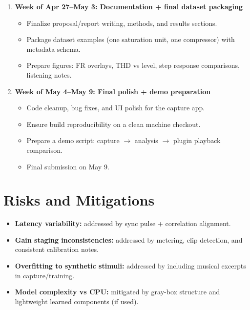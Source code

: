 \documentclass[11pt, letterpaper]{article}
\begin{document}
\begin{enumerate}[leftmargin=1.5em]
\begin{itemize}[leftmargin=1.5em]
              \item Iterate: adjust filter parameters, waveshaper mapping, optional GR-dependent color block.
              \item Profile CPU and confirm stable real-time operation at up to 96\,kHz.
          \end{itemize}
    \item \textbf{Week of Apr 27--May 3: Documentation + final dataset packaging}
          \begin{itemize}[leftmargin=1.5em]
              \item Finalize proposal/report writing, methods, and results sections.
              \item Package dataset examples (one saturation unit, one compressor) with metadata schema.
              \item Prepare figures: FR overlays, THD vs level, step response comparisons, listening notes.
          \end{itemize}
    \item \textbf{Week of May 4--May 9: Final polish + demo preparation}
          \begin{itemize}[leftmargin=1.5em]
              \item Code cleanup, bug fixes, and UI polish for the capture app.
              \item Ensure build reproducibility on a clean machine checkout.
              \item Prepare a demo script: capture $\to$ analysis $\to$ plugin playback comparison.
              \item Final submission on May 9.
          \end{itemize}
\end{enumerate}

\section{Risks and Mitigations}
\label{sec:risks}

\begin{itemize}[leftmargin=1.5em]
    \item \textbf{Latency variability:} addressed by sync pulse + correlation alignment.
    \item \textbf{Gain staging inconsistencies:} addressed by metering, clip detection, and consistent calibration notes.
    \item \textbf{Overfitting to synthetic stimuli:} addressed by including musical excerpts in capture/training.
    \item \textbf{Model complexity vs CPU:} mitigated by gray-box structure and lightweight learned components (if used).
\end{itemize}
\end{document}
